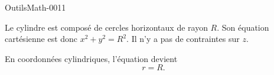 
\begin{corrige}{OutilsMath-0011}

	Le cylindre est composé de cercles horizontaux de rayon $R$. Son équation cartésienne est donc $x^2+y^2=R^2$. Il n'y a pas de contraintes sur $z$.

	En coordonnées cylindriques, l'équation devient
	\begin{equation}
		r=R.
	\end{equation}

\end{corrige}

